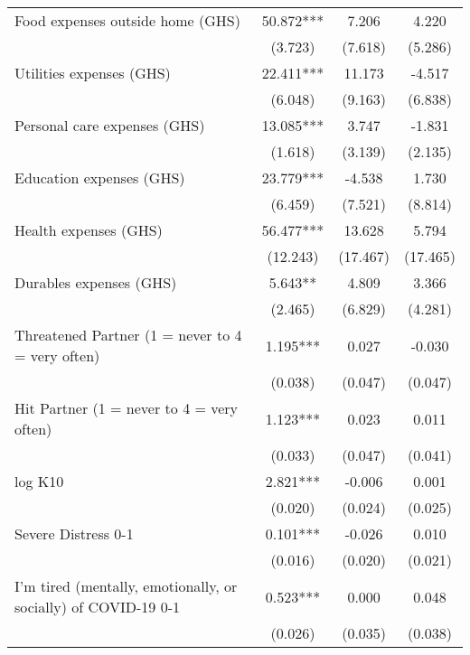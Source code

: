 \begin{ThreePartTable}
\begin{table}[tbp]
\begin{tabular}{lccc}
 Food expenses outside home (GHS) & 50.872*** & 7.206 & 4.220 \\ [0.1em] 
                   &      (3.723)     &      (7.618)     &      (5.286)     \\ [0.1em] 
 Utilities expenses (GHS) & 22.411*** & 11.173 & -4.517 \\ [0.1em] 
                   &      (6.048)     &      (9.163)     &      (6.838)     \\ [0.1em] 
 Personal care expenses (GHS) & 13.085*** & 3.747 & -1.831 \\ [0.1em] 
                   &      (1.618)     &      (3.139)     &      (2.135)     \\ [0.1em] 
 Education expenses (GHS) & 23.779*** & -4.538 & 1.730 \\ [0.1em] 
                   &      (6.459)     &      (7.521)     &      (8.814)     \\ [0.1em] 
 Health expenses (GHS) & 56.477*** & 13.628 & 5.794 \\ [0.1em] 
                   &      (12.243)     &      (17.467)     &      (17.465)     \\ [0.1em] 
 Durables expenses (GHS) & 5.643** & 4.809 & 3.366 \\ [0.1em] 
                   &      (2.465)     &      (6.829)     &      (4.281)     \\ [0.1em] 
 Threatened Partner (1 = never to 4 = very often) & 1.195*** & 0.027 & -0.030 \\ [0.1em] 
                   &      (0.038)     &      (0.047)     &      (0.047)     \\ [0.1em] 
 Hit Partner (1 = never to 4 = very often) & 1.123*** & 0.023 & 0.011 \\ [0.1em] 
                   &      (0.033)     &      (0.047)     &      (0.041)     \\ [0.1em] 
 log K10 & 2.821*** & -0.006 & 0.001 \\ [0.1em] 
                   &      (0.020)     &      (0.024)     &      (0.025)     \\ [0.1em] 
 Severe Distress 0-1 & 0.101*** & -0.026 & 0.010 \\ [0.1em] 
                   &      (0.016)     &      (0.020)     &      (0.021)     \\ [0.1em] 
 I'm tired (mentally, emotionally, or socially) of COVID-19 0-1 & 0.523*** & 0.000 & 0.048 \\ [0.1em] 
                   &      (0.026)     &      (0.035)     &      (0.038)     \\ [0.1em] 

\end{tabular}
\end{table}
\end{ThreePartTable}
